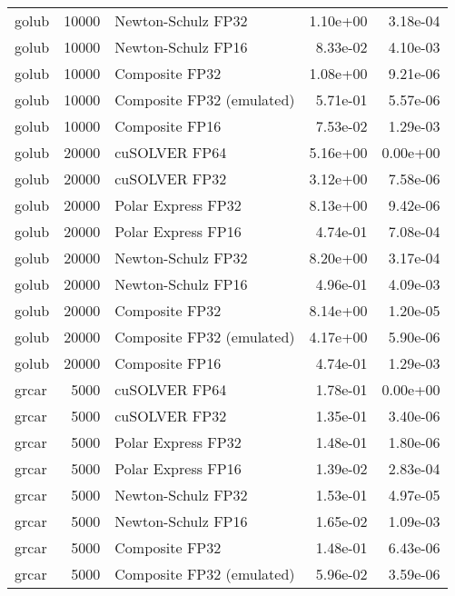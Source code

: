 \begin{table}
\begin{tabular}{lrlrr}
    golub & 10000 &        Newton-Schulz FP32 &  1.10e+00 &        3.18e-04 \\
    golub & 10000 &        Newton-Schulz FP16 &  8.33e-02 &        4.10e-03 \\
    golub & 10000 &            Composite FP32 &  1.08e+00 &        9.21e-06 \\
    golub & 10000 & Composite FP32 (emulated) &  5.71e-01 &        5.57e-06 \\
    golub & 10000 &            Composite FP16 &  7.53e-02 &        1.29e-03 \\
    golub & 20000 &             cuSOLVER FP64 &  5.16e+00 &        0.00e+00 \\
    golub & 20000 &             cuSOLVER FP32 &  3.12e+00 &        7.58e-06 \\
    golub & 20000 &        Polar Express FP32 &  8.13e+00 &        9.42e-06 \\
    golub & 20000 &        Polar Express FP16 &  4.74e-01 &        7.08e-04 \\
    golub & 20000 &        Newton-Schulz FP32 &  8.20e+00 &        3.17e-04 \\
    golub & 20000 &        Newton-Schulz FP16 &  4.96e-01 &        4.09e-03 \\
    golub & 20000 &            Composite FP32 &  8.14e+00 &        1.20e-05 \\
    golub & 20000 & Composite FP32 (emulated) &  4.17e+00 &        5.90e-06 \\
    golub & 20000 &            Composite FP16 &  4.74e-01 &        1.29e-03 \\
    grcar &  5000 &             cuSOLVER FP64 &  1.78e-01 &        0.00e+00 \\
    grcar &  5000 &             cuSOLVER FP32 &  1.35e-01 &        3.40e-06 \\
    grcar &  5000 &        Polar Express FP32 &  1.48e-01 &        1.80e-06 \\
    grcar &  5000 &        Polar Express FP16 &  1.39e-02 &        2.83e-04 \\
    grcar &  5000 &        Newton-Schulz FP32 &  1.53e-01 &        4.97e-05 \\
    grcar &  5000 &        Newton-Schulz FP16 &  1.65e-02 &        1.09e-03 \\
    grcar &  5000 &            Composite FP32 &  1.48e-01 &        6.43e-06 \\
    grcar &  5000 & Composite FP32 (emulated) &  5.96e-02 &        3.59e-06 \\

\end{tabular}
\end{table}
